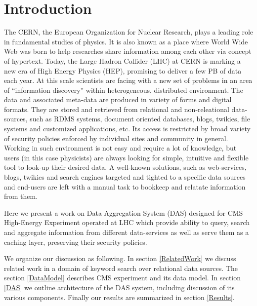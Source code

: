 \documentclass[a4paper]{jpconf}
\begin{document}
\newpage

\section{Introduction}
The CERN, the European Organization for Nuclear Research, plays a leading
role in fundamental studies of physics. It is also known as a place where
World Wide Web was born to help researches share information among each other
via concept of hypertext.
Today, the Large Hadron Collider (LHC) at CERN is marking a new era of High Energy
Physics (HEP), promising to deliver a few PB of data each year. 
At this scale scientists are facing with a new set of problems in an area of
``information discovery'' within heterogeneous, distributed environment.
The data and associated meta-data are produced in variety of forms and digital formats.
They are stored and retrieved from relational and non-releational data-sources, such as 
RDMS systems, document oriented databases, blogs, twikies, file systems and
customized applications, etc. Its access is restricted by broad variety of security 
policies enforced by individual sites and community in general.
Working in such environment is not easy and require a lot of knowledge, but users
(in this case physicists) are always looking for simple, intuitive and flexible
tool to look-up their desired data. A well-known solutions, such as web-services,
blogs, twikies and search engines targeted and tighted to a specific data
sources and end-users are left with a manual task to bookkeep and relatate information
from them.

Here we present a work on Data Aggregation System (DAS) designed for
CMS High-Energy Experiment operated at LHC which provide
ability to query, search and aggregate information from different 
data-services as well as serve them as a caching layer, 
preserving their security policies. 

We organize
our discussion as following. In section \ref{RelatedWork} we discuss
related work in a domain of keyword search over relational data sources.
The section \ref{DataModel} describes CMS experiment and its data model. In section
\ref{DAS} we outline architecture of the DAS system, including discussion of its
various components. Finally our results are summarized in section \ref{Results}.

\end{document}
